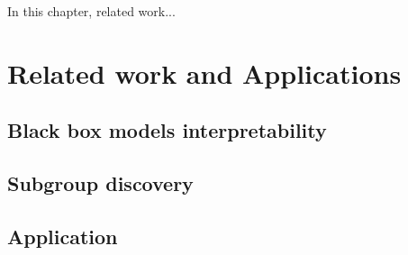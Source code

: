 In this chapter, related work... \cite{eli5}

\section{Related work and Applications}


\subsection{Black box models interpretability}


\subsection{Subgroup discovery}


\subsection{Application}






